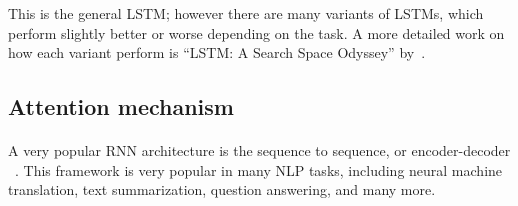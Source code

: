 
This is the general LSTM; however there are many variants of LSTMs, which perform slightly better or worse depending on the task. A more detailed work on how each variant perform is ``LSTM: A Search Space Odyssey'' by~\citet{greff2017lstm}.


\subsection{Attention mechanism}
\label{sec:encoder_decoder}


\paragraph{}
A very popular RNN architecture is the sequence to sequence, or encoder-decoder ~\citep{cho-etal-2014-learning,sutskever2014sequence}. This framework is very popular in many NLP tasks, including neural machine translation, text summarization, question answering, and many more. 

